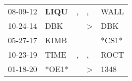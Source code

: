 \begin{supertabular}{p{0.07\textwidth}p{0.06\textwidth}p{0.02\textwidth}p{0.02\textwidth}p{0.06\textwidth}}
 08-09-12\textsuperscript{} &  \textbf{LIQU\textsuperscript{}} &             , &             , &           WALL\textsuperscript{} \\
 10-24-14\textsuperscript{} &            DBK\textsuperscript{} &               &  \textgreater &            DBK\textsuperscript{} \\
 05-27-17\textsuperscript{} &           KIMB\textsuperscript{} &               &               &                            *CS1* \\
 10-23-19\textsuperscript{} &           TIME\textsuperscript{} &             , &             , &           ROCT\textsuperscript{} \\
 01-18-20\textsuperscript{} &                            *OE1* &               &  \textgreater &           1348\textsuperscript{} \\
\end{supertabular}
